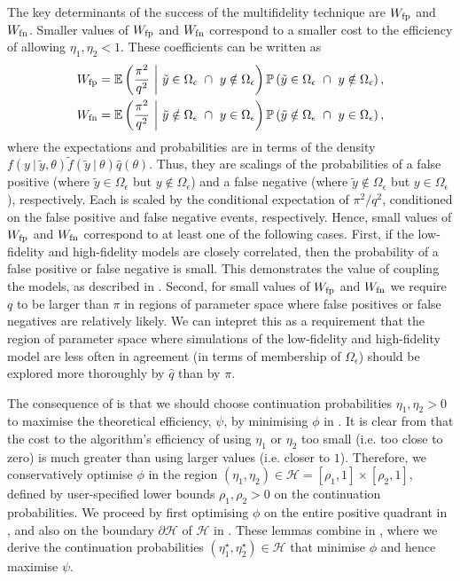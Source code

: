 \documentclass[review]{siamonline190516}
\begin{document}
The key determinants of the success of the multifidelity technique are $W_{\mathrm{fp}}$ and $W_{\mathrm{fn}}$.
Smaller values of $W_{\mathrm{fp}}$ and $W_{\mathrm{fn}}$ correspond to a smaller cost to the efficiency of allowing $\eta_1,\eta_2<1$.
These coefficients can be written as
\begin{align*}
 W_{\mathrm{fp}} 
 &= 
 \mathbb E \left( \frac{\pi^2}{q^2} ~\bigg|~ \tilde y \in \Omega_\epsilon ~\cap~ y \notin \Omega_\epsilon \right) \mathbb P \left( \tilde y \in \Omega_\epsilon ~\cap~ y \notin \Omega_\epsilon \right),
 \\
 W_{\mathrm{fn}} 
 &= 
 \mathbb E \left( \frac{\pi^2}{q^2} ~\bigg|~ \tilde y \notin \Omega_\epsilon ~\cap~ y \in \Omega_\epsilon \right) \mathbb P \left( \tilde y \notin \Omega_\epsilon ~\cap~ y \in \Omega_\epsilon \right),
\end{align*}
where the expectations and probabilities are in terms of the density $f(y~|~\tilde y, \theta) \tilde f(\tilde y~|~\theta) \hat q(\theta)$.
Thus, they are scalings of the probabilities of a false positive (where $\tilde y \in \Omega_\epsilon$ but $y \notin \Omega_\epsilon$) and a false negative (where $\tilde y \notin \Omega_\epsilon$ but $y \in \Omega_\epsilon$), respectively.
Each is scaled by the conditional expectation of $\pi^2 / q^2$, conditioned on the false positive and false negative events, respectively.
Hence, small values of $W_{\mathrm{fp}}$ and $W_{\mathrm{fn}}$ correspond to at least one of the following cases.
First, if the low-fidelity and high-fidelity models are closely correlated, then the probability of a false positive or false negative is small.
This demonstrates the value of coupling the models, as described in .
Second, for small values of $W_{\mathrm{fp}}$ and $W_{\mathrm{fn}}$ we require $q$ to be larger than $\pi$ in regions of parameter space where false positives or false negatives are relatively likely.
We can intepret this as a requirement that the region of parameter space where simulations of the low-fidelity and high-fidelity model are less often in agreement (in terms of membership of $\Omega_\epsilon$) should be explored more thoroughly by $\hat q$ than by $\pi$.

The consequence of  is that we should choose continuation probabilities $\eta_1,\eta_2>0$ to maximise the theoretical efficiency, $\psi$, by minimising $\phi$ in .
It is clear from  that the cost to the algorithm's efficiency of using $\eta_1$ or $\eta_2$ too small (i.e. too close to zero) is much greater than using larger values (i.e. closer to $1$).
Therefore, we conservatively optimise $\phi$ in the region $(\eta_1,\eta_2) \in \mathcal H = [\rho_1,1] \times [\rho_2, 1]$, defined by user-specified lower bounds $\rho_1, \rho_2 > 0$ on the continuation probabilities.
We proceed by first optimising $\phi$ on the entire positive quadrant in , and also on the boundary $\partial \mathcal H$ of $\mathcal H$ in . 
These lemmas combine in , where we derive the continuation probabilities $(\eta_1^\star, \eta_2^\star) \in \mathcal H$ that minimise $\phi$ and hence maximise $\psi$.
\end{document}
